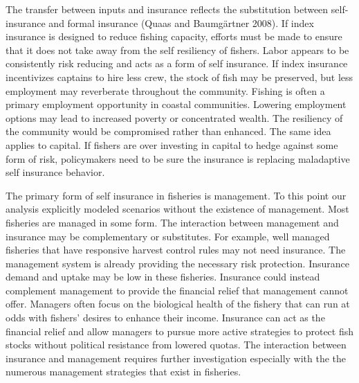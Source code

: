 \documentclass[
  letterpaper,
  DIV=11,
  numbers=noendperiod]{scrartcl}
\theoremstyle{plain}
\theoremstyle{plain}
\theoremstyle{remark}
\begin{document}
The transfer between inputs and insurance reflects the substitution
between self-insurance and formal insurance (Quaas and Baumgärtner
2008). If index insurance is designed to reduce fishing capacity,
efforts must be made to ensure that it does not take away from the self
resiliency of fishers. Labor appears to be consistently risk reducing
and acts as a form of self insurance. If index insurance incentivizes
captains to hire less crew, the stock of fish may be preserved, but less
employment may reverberate throughout the community. Fishing is often a
primary employment opportunity in coastal communities. Lowering
employment options may lead to increased poverty or concentrated wealth.
The resiliency of the community would be compromised rather than
enhanced. The same idea applies to capital. If fishers are over
investing in capital to hedge against some form of risk, policymakers
need to be sure the insurance is replacing maladaptive self insurance
behavior.

The primary form of self insurance in fisheries is management. To this
point our analysis explicitly modeled scenarios without the existence of
management. Most fisheries are managed in some form. The interaction
between management and insurance may be complementary or substitutes.
For example, well managed fisheries that have responsive harvest control
rules may not need insurance. The management system is already providing
the necessary risk protection. Insurance demand and uptake may be low in
these fisheries. Insurance could instead complement management to
provide the financial relief that management cannot offer. Managers
often focus on the biological health of the fishery that can run at odds
with fishers' desires to enhance their income. Insurance can act as the
financial relief and allow managers to pursue more active strategies to
protect fish stocks without political resistance from lowered quotas.
The interaction between insurance and management requires further
investigation especially with the the numerous management strategies
that exist in fisheries.
\end{document}
